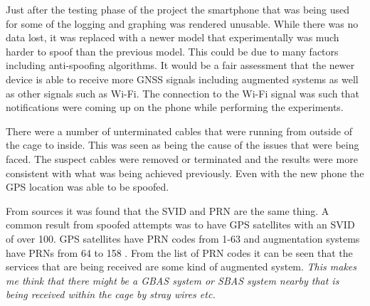 Just after the testing phase of the project the smartphone that was being used for some of the logging and graphing was rendered unusable. While there was no data lost,
it was replaced with a newer model that experimentally was much harder to spoof than the previous model. This could be due to many factors including anti-spoofing
algorithms. It would be a fair assessment that the newer device is able to receive more GNSS signals including augmented systems as well as other signals such as Wi-Fi.
The connection to the Wi-Fi signal was such that notifications were coming up on the phone while performing the experiments.

There were a number of unterminated cables that were running from outside of the cage to inside. This was seen as being the cause of the issues that were being faced. The
suspect cables were removed or terminated and the results were more consistent with what was being achieved previously. Even with the new phone the GPS location was able
to be spoofed.

From sources  it was found that the SVID and PRN are the same thing. 
A common result from spoofed attempts was to have GPS satellites with an SVID of over 100. GPS satellites have PRN codes from 1-63 and augmentation systems have PRNs from
64 to 158 \cite{RN67}. From the list of PRN codes \cite{RN67} it can be seen that the services that are being received are some kind of augmented system. \emph{This makes
me think that there might be a GBAS system or SBAS system nearby that is being received within the cage by stray wires etc.}
